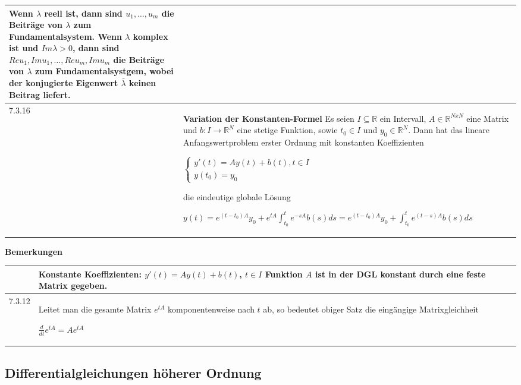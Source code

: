 \begin{table}[H]
\begin{tabularx}{\textwidth}{X m{16cm}}
                Wenn $\lambda$ reell ist, dann sind $u_1, \dots, u_m$ die Beiträge von $\lambda$ zum Fundamentalsystem. \hfill \break
                Wenn $\lambda$ komplex ist und $Im\lambda > 0$, dann sind $Reu_1, Imu_1,\dots,Reu_m, Imu_m$ die Beiträge von $\lambda$ zum
                Fundamentalsystgem, wobei der konjugierte Eigenwert $\bar{\lambda}$ keinen Beitrag liefert.\\
        \midrule
        7.3.16& \textbf{Variation der Konstanten-Formel} \hfill \break
                Es seien $I \subseteq \mathbb{R}$ ein Intervall, $A \in \mathbb{R}^{NxN}$ eine Matrix und $b: I \rightarrow \mathbb{R}^N$ eine 
                stetige Funktion, sowie $t_0 \in I$ und $y_0 \in \mathbb{R}^N$. Dann hat das lineare Anfangswertproblem erster Ordnung mit
                konstanten Koeffizienten \hfill \break
                \centerline{$   \begin{cases}
                                y'(t) = Ay(t) +b(t), t \in I \\
                                y(t_0) = y_0
                                \end{cases} $}
                die eindeutige globale Lösung \hfill \break
                \centerline{$ y(t) = e^{(t-t_0)A}y_0 + e^{tA} \int^t_{t_0} e^{-sA}b(s) ds = e^{(t-t_0)A}y_0 + \int^t_{t_0} e^{(t-s)A}b(s) ds $}\\
        \bottomrule
    \end{tabularx}
    \end{table}

    \noindent
    \textbf{Bemerkungen}
    \begin{table}[H]
    \begin{tabularx}{\textwidth}{X m{16cm}}
        \toprule

              & Konstante Koeffizienten: $y'(t) = Ay(t) + b(t)$, $t \in I$ \hfill \break
                Funktion $A$ ist in der DGL konstant durch eine feste Matrix gegeben. \\
        \midrule
        7.3.12& Leitet man die gesamte Matrix $e^{tA}$ komponentenweise nach $t$ ab, so bedeutet obiger Satz die eingängige Matrixgleichheit
                \hfill \break \centerline{$ \frac{d}{dt}e^{tA} = A e^{tA} $} \\

        \bottomrule
    \end{tabularx}
    \end{table}


\subsection{Differentialgleichungen höherer Ordnung}

